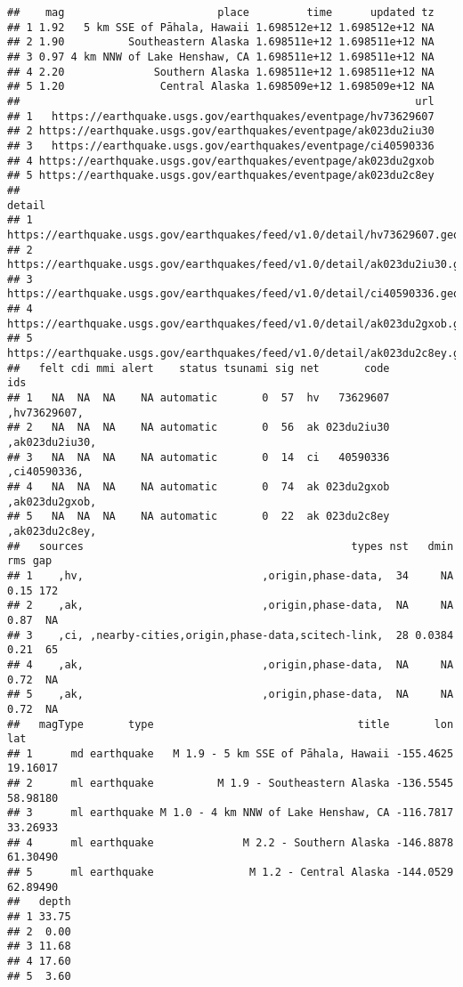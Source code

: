 \documentclass[
]{article}
\begin{document}
\begin{verbatim}
##    mag                        place         time      updated tz
## 1 1.92   5 km SSE of Pāhala, Hawaii 1.698512e+12 1.698512e+12 NA
## 2 1.90          Southeastern Alaska 1.698511e+12 1.698511e+12 NA
## 3 0.97 4 km NNW of Lake Henshaw, CA 1.698511e+12 1.698511e+12 NA
## 4 2.20              Southern Alaska 1.698511e+12 1.698511e+12 NA
## 5 1.20               Central Alaska 1.698509e+12 1.698509e+12 NA
##                                                              url
## 1   https://earthquake.usgs.gov/earthquakes/eventpage/hv73629607
## 2 https://earthquake.usgs.gov/earthquakes/eventpage/ak023du2iu30
## 3   https://earthquake.usgs.gov/earthquakes/eventpage/ci40590336
## 4 https://earthquake.usgs.gov/earthquakes/eventpage/ak023du2gxob
## 5 https://earthquake.usgs.gov/earthquakes/eventpage/ak023du2c8ey
##                                                                          detail
## 1   https://earthquake.usgs.gov/earthquakes/feed/v1.0/detail/hv73629607.geojson
## 2 https://earthquake.usgs.gov/earthquakes/feed/v1.0/detail/ak023du2iu30.geojson
## 3   https://earthquake.usgs.gov/earthquakes/feed/v1.0/detail/ci40590336.geojson
## 4 https://earthquake.usgs.gov/earthquakes/feed/v1.0/detail/ak023du2gxob.geojson
## 5 https://earthquake.usgs.gov/earthquakes/feed/v1.0/detail/ak023du2c8ey.geojson
##   felt cdi mmi alert    status tsunami sig net       code            ids
## 1   NA  NA  NA    NA automatic       0  57  hv   73629607   ,hv73629607,
## 2   NA  NA  NA    NA automatic       0  56  ak 023du2iu30 ,ak023du2iu30,
## 3   NA  NA  NA    NA automatic       0  14  ci   40590336   ,ci40590336,
## 4   NA  NA  NA    NA automatic       0  74  ak 023du2gxob ,ak023du2gxob,
## 5   NA  NA  NA    NA automatic       0  22  ak 023du2c8ey ,ak023du2c8ey,
##   sources                                          types nst   dmin  rms gap
## 1    ,hv,                            ,origin,phase-data,  34     NA 0.15 172
## 2    ,ak,                            ,origin,phase-data,  NA     NA 0.87  NA
## 3    ,ci, ,nearby-cities,origin,phase-data,scitech-link,  28 0.0384 0.21  65
## 4    ,ak,                            ,origin,phase-data,  NA     NA 0.72  NA
## 5    ,ak,                            ,origin,phase-data,  NA     NA 0.72  NA
##   magType       type                                title       lon      lat
## 1      md earthquake   M 1.9 - 5 km SSE of Pāhala, Hawaii -155.4625 19.16017
## 2      ml earthquake          M 1.9 - Southeastern Alaska -136.5545 58.98180
## 3      ml earthquake M 1.0 - 4 km NNW of Lake Henshaw, CA -116.7817 33.26933
## 4      ml earthquake              M 2.2 - Southern Alaska -146.8878 61.30490
## 5      ml earthquake               M 1.2 - Central Alaska -144.0529 62.89490
##   depth
## 1 33.75
## 2  0.00
## 3 11.68
## 4 17.60
## 5  3.60
\end{verbatim}
\end{document}
